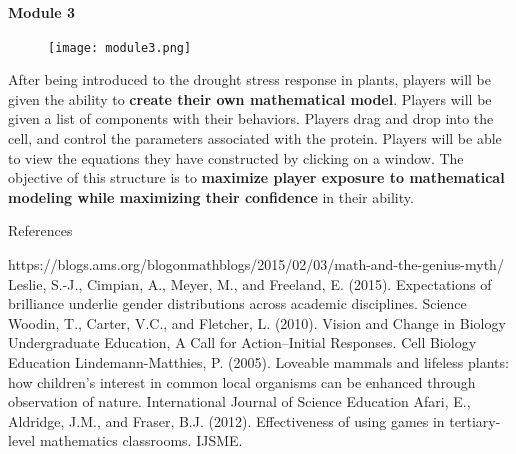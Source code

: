 \documentclass[final]{beamer}
\newlength{\onecolwid}
\begin{document}
\begin{frame}[t]
\begin{columns}[t]
\begin{column}{\onecolwid} %


\begin{alertblock}{\color{Grey}\textbf{Module 3}}
	\begin{figure}
	\texttt{[image: module3.png]}
\end{figure}
\small{After being introduced to the drought stress response in plants, players will be given the ability to \textbf{create their own mathematical model}. Players will be given a list of components with their behaviors. Players drag and drop into the cell, and control the parameters associated with the protein. Players will be able to view the equations they have constructed by clicking on a window. The objective of this structure is to \textbf{maximize player exposure to mathematical modeling while maximizing their confidence }in their ability. }
\end{alertblock}



\vspace{1cm}
\begin{block}{References}
\small{
\begin{thebibliography}{99}
 https://blogs.ams.org/blogonmathblogs/2015/02/03/math-and-the-genius-myth/
Leslie, S.-J., Cimpian, A., Meyer, M., and Freeland, E. (2015). Expectations of brilliance underlie gender distributions across academic disciplines. Science 
Woodin, T., Carter, V.C., and Fletcher, L. (2010). Vision and Change in Biology Undergraduate Education, A Call for Action--Initial Responses. Cell Biology Education 
Lindemann-Matthies, P. (2005). 
Loveable mammals and lifeless plants: how children's interest in common local organisms can be enhanced through observation of nature. International Journal of Science Education
Afari, E., Aldridge, J.M., and Fraser, B.J. (2012). Effectiveness of using games in tertiary-level mathematics classrooms. IJSME.


\end{thebibliography}}
\end{block}
\end{column}
\end{columns}
\end{frame}
\end{document}
